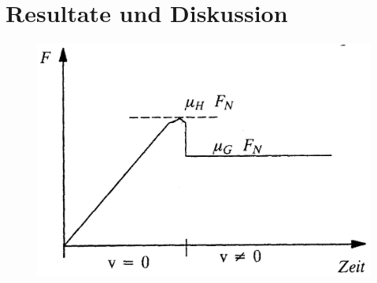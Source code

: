 \section{Resultate und Diskussion}

\begin{figure}
    \centering
    \includegraphics[width=.7\linewidth]{images/haft_gleit_uebergang}
    \caption{}
\end{figure}

